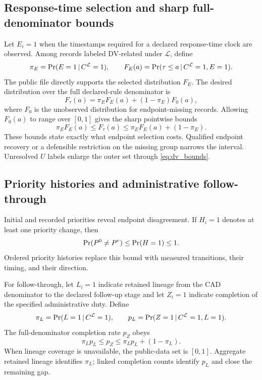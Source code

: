 \documentclass[11pt]{article}
\begin{document}
\subsection{Response-time selection and sharp full-denominator bounds}

Let $E_i=1$ when the timestamps required for a declared response-time clock are observed. Among records labeled DV-related under $\mathcal L$, define
\begin{equation}
\pi_E=\Pr(E=1\,|\, C^{\mathcal L}=1),
\qquad
F_E(a)=\Pr(\tau\le a\,|\, C^{\mathcal L}=1,E=1).
\end{equation}
The public file directly supports the selected distribution $F_E$. The desired distribution over the full declared-rule denominator is
\begin{equation}
F_\tau(a)=\pi_EF_E(a)+(1-\pi_E)F_0(a),
\end{equation}
where $F_0$ is the unobserved distribution for endpoint-missing records. Allowing $F_0(a)$ to range over $[0,1]$ gives the sharp pointwise bounds
\begin{equation}
\pi_EF_E(a)
\le F_\tau(a)\le
\pi_EF_E(a)+(1-\pi_E).
\label{eq:response_bounds}
\end{equation}
These bounds state exactly what endpoint selection costs. Qualified endpoint recovery or a defensible restriction on the missing group narrows the interval. Unresolved $U$ labels enlarge the outer set through \cref{eq:dv_bounds}.

\subsection{Priority histories and administrative follow-through}

Initial and recorded priorities reveal endpoint disagreement. If $H_i=1$ denotes at least one priority change, then
\begin{equation}
\Pr(P^0\ne P^r)
\le \Pr(H=1)\le 1.
\label{eq:priority_bounds}
\end{equation}
Ordered priority histories replace this bound with measured transitions, their timing, and their direction.

For follow-through, let $L_i=1$ indicate retained lineage from the CAD denominator to the declared follow-up stage and let $Z_i=1$ indicate completion of the specified administrative duty. Define
\begin{equation}
\pi_L=\Pr(L=1\,|\, C^{\mathcal L}=1),
\qquad
p_L=\Pr(Z=1\,|\, C^{\mathcal L}=1,L=1).
\end{equation}
The full-denominator completion rate $p_Z$ obeys
\begin{equation}
\pi_Lp_L
\le p_Z\le
\pi_Lp_L+(1-\pi_L).
\label{eq:follow_bounds}
\end{equation}
When lineage coverage is unavailable, the public-data set is $[0,1]$. Aggregate retained lineage identifies $\pi_L$; linked completion counts identify $p_L$ and close the remaining gap.
\end{document}
